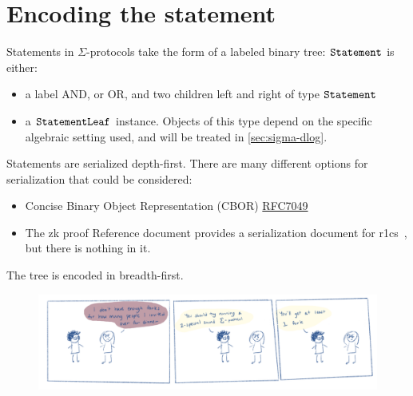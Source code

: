 \documentclass[11pt]{article}
\begin{document}
\section{Encoding the statement}

Statements in $\Sigma$-protocols take the form of a labeled binary tree:
$\texttt{Statement}$ is either:
\begin{itemize}
  \item a label \textsf{AND}, or \textsf{OR}, and two children \textsf{left} and \textsf{right} of type $\texttt{Statement}$
  \item a $\texttt{StatementLeaf}$ instance. Objects of this type depend on the specific algebraic setting used, and will be treated in \cref{sec:sigma-dlog}.
\end{itemize}
Statements are serialized depth-first.
  There are many different options for serialization that could be considered:
  \begin{itemize}
  \item Concise Binary Object Representation (CBOR) \href{https://datatracker.ietf.org/doc/html/rfc7049}{RFC7049}
    \item The zk proof Reference document provides a serialization document for r1cs~\cite[3.4.2]{zkproof-reference}, but there is nothing in it.
\end{itemize}
The tree is encoded in breadth-first.







\begin{figure}[b]
\includegraphics[width=\textwidth]{Dinner_Party.png}
\end{figure}
\end{document}
